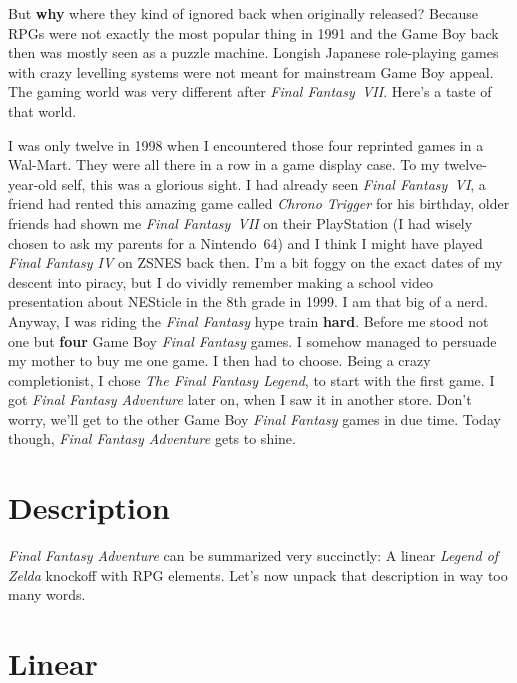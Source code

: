 \documentclass{book}
\begin{document}
But \textbf{why} where they kind of ignored back when originally released? Because RPGs were not exactly the most popular thing in 1991 and the Game Boy back then was mostly seen as a puzzle machine. Longish Japanese role-playing games with crazy levelling systems were not meant for mainstream Game Boy appeal. The gaming world was very different after \emph{Final Fantasy VII}. Here’s a taste of that world.

I was only twelve in 1998 when I encountered those four reprinted games in a Wal-Mart. They were all there in a row in a game display case. To my twelve-year-old self, this was a glorious sight. I had already seen \emph{Final Fantasy VI}, a friend had rented this amazing game called \emph{Chrono Trigger} for his birthday, older friends had shown me \emph{Final Fantasy VII} on their PlayStation (I had wisely chosen to ask my parents for a Nintendo 64) and I think I might have played \emph{Final Fantasy IV} on ZSNES back then. I’m a bit foggy on the exact dates of my descent into piracy, but I do vividly remember making a school video presentation about NESticle in the 8th grade in 1999. I am that big of a nerd. Anyway, I was riding the \emph{Final Fantasy} hype train \textbf{hard}. Before me stood not one but \textbf{four} Game Boy \emph{Final Fantasy} games. I somehow managed to persuade my mother to buy me one game. I then had to choose. Being a crazy completionist, I chose \emph{The Final Fantasy Legend}, to start with the first game. I got \emph{Final Fantasy Adventure} later on, when I saw it in another store. Don’t worry, we’ll get to the other Game Boy \emph{Final Fantasy} games in due time. Today though, \emph{Final Fantasy Adventure} gets to shine.

\FloatBarrier\needspace{5pt}\section*{Description}\nopagebreak[4]

\emph{Final Fantasy Adventure} can be summarized very succinctly: A linear \emph{Legend of Zelda} knockoff with RPG elements. Let’s now unpack that description in way too many words.

\FloatBarrier\needspace{5pt}\section*{Linear}\nopagebreak[4]
\end{document}
